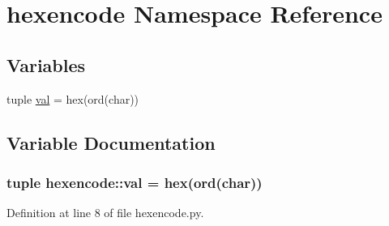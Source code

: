 \hypertarget{namespacehexencode}{
\section{hexencode Namespace Reference}
\label{namespacehexencode}
}
\subsection*{Variables}
\begin{DoxyCompactItemize}
\item 
tuple \hyperlink{namespacehexencode_af6ad229512e9ff7deaa79163a3be884a}{val} = hex(ord(char))
\end{DoxyCompactItemize}


\subsection{Variable Documentation}
\hypertarget{namespacehexencode_af6ad229512e9ff7deaa79163a3be884a}{
\subsubsection[{val}]{\setlength{\rightskip}{0pt plus 5cm}tuple {\bf hexencode::val} = hex(ord(char))}}
\label{namespacehexencode_af6ad229512e9ff7deaa79163a3be884a}


Definition at line 8 of file hexencode.py.

